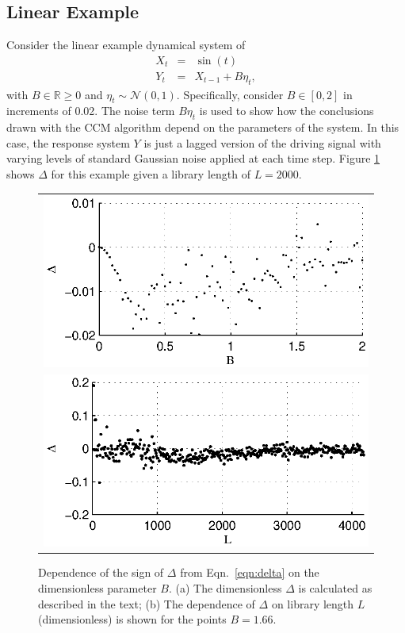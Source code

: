 \documentclass[twocolumn,aps,pre,groupedaddress]{revtex4-1}
\begin{document}
\subsection{Linear Example}
Consider the linear example dynamical system of
\begin{eqnarray}
\label{eq:linearex}
X_t &=& \sin(t)\\
Y_t &=& X_{t-1}+B\eta_t,
\end{eqnarray}
with $B\in\mathbb{R}\ge 0$ and $\eta_t\sim\mathcal{N}\left(0,1\right)$.  Specifically, consider $B\in[0,2]$ in increments of 0.02.  The noise term $B\eta_t$ is used to show how the conclusions drawn with the CCM algorithm depend on the parameters of the system.  In this case, the response system $Y$ is just a lagged version of the driving signal with varying levels of standard Gaussian noise applied at each time step.  Figure \ref{fig:linearex1} shows $\Delta$ for this example given a library length of $L=2000$.
\begin{figure}[ht]
\begin{tabular}{l}
\includegraphics[scale=0.8]{LinearEx.eps} \\
\includegraphics[scale=0.8]{LinearExChangeL.eps} \\
\end{tabular}
\caption{Dependence of the sign of $\Delta$ from Eqn.\ \ref{eqn:delta} on the dimensionless parameter $B$. (a) The dimensionless $\Delta$ is calculated as described in the text; (b) The dependence of $\Delta$ on library length $L$ (dimensionless) is shown for the points $B = 1.66$.}
\label{fig:linearex1}
\end{figure}
\end{document}
